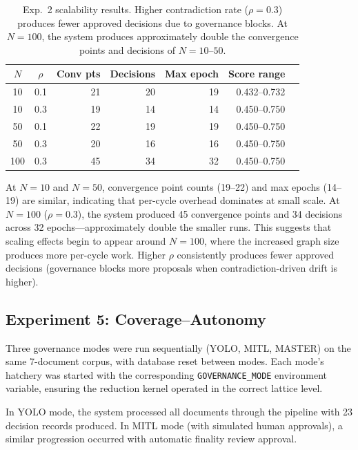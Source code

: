 \documentclass[11pt]{article}
\begin{document}
\begin{table}[H]
\centering
\small
\begin{tabular}{ccrrrrr}
\toprule
\textbf{$N$} & \textbf{$\rho$} & \textbf{Conv pts} & \textbf{Decisions} & \textbf{Max epoch} & \textbf{Score range} \\
\midrule
10  & 0.1 & 21 & 20 & 19 & 0.432--0.732 \\
10  & 0.3 & 19 & 14 & 14 & 0.450--0.750 \\
50  & 0.1 & 22 & 19 & 19 & 0.450--0.750 \\
50  & 0.3 & 20 & 16 & 16 & 0.450--0.750 \\
100 & 0.3 & 45 & 34 & 32 & 0.450--0.750 \\
\bottomrule
\end{tabular}
\caption{Exp.~2 scalability results. Higher contradiction rate ($\rho = 0.3$) produces fewer approved decisions due to governance blocks. At $N = 100$, the system produces approximately double the convergence points and decisions of $N = 10\text{--}50$.}
\label{tab:exp2-results}
\end{table}

At $N = 10$ and $N = 50$, convergence point counts (19--22) and max epochs (14--19) are similar, indicating that per-cycle overhead dominates at small scale. At $N = 100$ ($\rho = 0.3$), the system produced 45 convergence points and 34 decisions across 32 epochs---approximately double the smaller runs. This suggests that scaling effects begin to appear around $N = 100$, where the increased graph size produces more per-cycle work. Higher $\rho$ consistently produces fewer approved decisions (governance blocks more proposals when contradiction-driven drift is higher).

\subsection{Experiment 5: Coverage--Autonomy}

Three governance modes were run sequentially (YOLO, MITL, MASTER) on the same 7-document corpus, with database reset between modes. Each mode's hatchery was started with the corresponding \texttt{GOVERNANCE\_MODE} environment variable, ensuring the reduction kernel operated in the correct lattice level.

In YOLO mode, the system processed all documents through the pipeline with 23 decision records produced. In MITL mode (with simulated human approvals), a similar progression occurred with automatic finality review approval.
\end{document}
